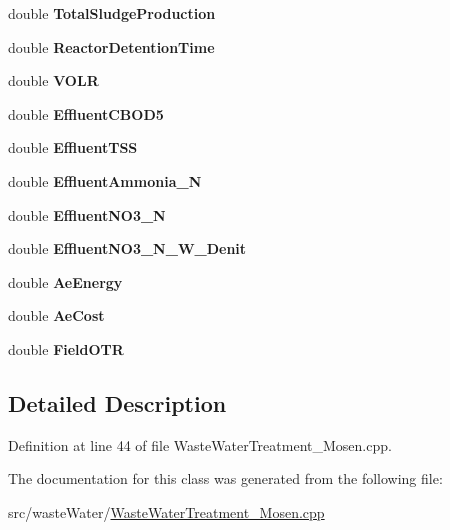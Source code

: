 \begin{DoxyCompactItemize}
double {\bfseries Total\+Sludge\+Production}
\item 
\mbox{\label{classoutput_table_a2da8c9069d4e9f1aa13ff9d0e064e37f}} 
double {\bfseries Reactor\+Detention\+Time}
\item 
\mbox{\label{classoutput_table_af92cf99e1250b32018fd07cdfd663674}} 
double {\bfseries V\+O\+LR}
\item 
\mbox{\label{classoutput_table_a880afee395088eee646d00b9c34db4f1}} 
double {\bfseries Effluent\+C\+B\+O\+D5}
\item 
\mbox{\label{classoutput_table_a0cf40afc7c30ddad89c3ca04adca9b29}} 
double {\bfseries Effluent\+T\+SS}
\item 
\mbox{\label{classoutput_table_a1d3111a0854ecc2057b8d6508c1219a9}} 
double {\bfseries Effluent\+Ammonia\+\_\+N}
\item 
\mbox{\label{classoutput_table_aa81eec4f9e848e9d1aa464b8e5392470}} 
double {\bfseries Effluent\+N\+O3\+\_\+N}
\item 
\mbox{\label{classoutput_table_a3cfee4b7fc89ac0af88db61df924bb4e}} 
double {\bfseries Effluent\+N\+O3\+\_\+\+N\+\_\+\+W\+\_\+\+Denit}
\item 
\mbox{\label{classoutput_table_ae642dd769e8f5a3c44d18a725b9e5e25}} 
double {\bfseries Ae\+Energy}
\item 
\mbox{\label{classoutput_table_a6eb056b835dcb077df3215fa56b770f5}} 
double {\bfseries Ae\+Cost}
\item 
\mbox{\label{classoutput_table_a145fe79152a856f318556cd2b3dfa493}} 
double {\bfseries Field\+O\+TR}
\end{DoxyCompactItemize}


\subsection{Detailed Description}


Definition at line 44 of file Waste\+Water\+Treatment\+\_\+\+Mosen.\+cpp.



The documentation for this class was generated from the following file\+:\begin{DoxyCompactItemize}
\item 
src/waste\+Water/\hyperlink{_waste_water_treatment___mosen_8cpp}{Waste\+Water\+Treatment\+\_\+\+Mosen.\+cpp}\end{DoxyCompactItemize}

